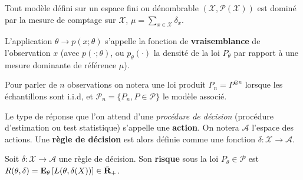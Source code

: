 \begin{rem}
	Tout modèle défini sur un espace fini ou dénombrable $(\mathcal{X}, \mathcal{P}(\mathcal{X}))$ est dominé par la mesure de comptage sur $\mathcal{X}$, $\mu = \sum_{x \in \mathcal{X}} \delta_x$.
\end{rem}

\begin{defn}
	L'application $\theta \to p(x ; \theta)$ s'appelle la fonction de \textbf{vraisemblance} de l'observation $x$ (avec $p(\cdot; \theta)$, ou $p_\theta(\cdot)$ la densité de la loi $P_\theta$ par rapport à une mesure dominante de référence $\mu$).
\end{defn}

\begin{note}
	Pour parler de $n$ observations on notera une loi produit $P_n = P^{\otimes n}$ lorsque les échantillons sont i.i.d, et $\mathcal{P}_n = \{ P_n, P \in \mathcal{P} \}$ le modèle associé.
\end{note}

\begin{defn}
	Le type de réponse que l'on attend d'une \emph{procédure de décision} (procédure d'estimation ou test statistique) s'appelle une \textbf{action}.
	On notera $\mathcal{A}$ l'espace des actions.
	Une \textbf{règle de décision} est alors définie comme une fonction $\delta \colon \mathcal{X} \to \mathcal{A}$.
\end{defn}

\begin{defn}
	Soit $\delta \colon \mathcal{X} \to \mathcal{A}$ une règle de décision.
	Son \textbf{risque} sous la loi $P_\theta \in \mathcal{P}$ est $R(\theta,\delta) = \mathbf{E}_\theta \left[ L(\theta, \delta(X)) \right] \in \bar{\mathbf{R}}_+$.
\end{defn}
